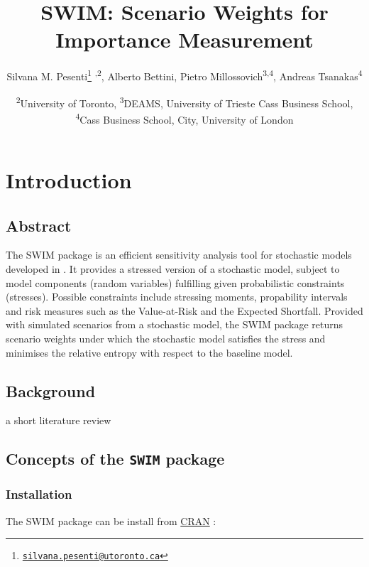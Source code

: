 \documentclass[]{article}
\title{SWIM: Scenario Weights for Importance Measurement}
\author{Silvana M. Pesenti\footnote{\href{mailto:silvana.pesenti@utoronto.ca}{\nolinkurl{silvana.pesenti@utoronto.ca}}} \textsuperscript{,2}, Alberto Bettini, Pietro Millossovich\textsuperscript{3,4}, Andreas Tsanakas\textsuperscript{4}}
\date{\textsuperscript{2}University of Toronto, \textsuperscript{3}DEAMS, University of Trieste Cass Business School, \textsuperscript{4}Cass Business School, City, University of London}
\begin{document}
\maketitle

{
\setcounter{tocdepth}{2}
\tableofcontents
}
\hypertarget{introduction}{%
\section{Introduction}\label{introduction}}

\hypertarget{abstract}{%
\subsection{Abstract}\label{abstract}}

The SWIM package is an efficient sensitivity analysis tool for stochastic models developed in \citet{Pesenti2019}. It provides a stressed version of a stochastic model, subject to model components (random variables) fulfilling given probabilistic constraints (stresses). Possible constraints include stressing moments, propability intervals and risk measures such as the Value-at-Risk and the Expected Shortfall. Provided with simulated scenarios from a stochastic model, the SWIM package returns scenario weights under which the stochastic model satisfies the stress and minimises the relative entropy with respect to the baseline model.

\hypertarget{background}{%
\subsection{Background}\label{background}}

a short literature review

\hypertarget{concepts-of-the-swim-package}{%
\subsection{\texorpdfstring{Concepts of the \texttt{SWIM} package}{Concepts of the SWIM package}}\label{concepts-of-the-swim-package}}

\hypertarget{installation}{%
\subsubsection{Installation}\label{installation}}

The SWIM package can be install from \href{https://CRAN.R-project.org/package=SWIM}{CRAN} :
\end{document}
